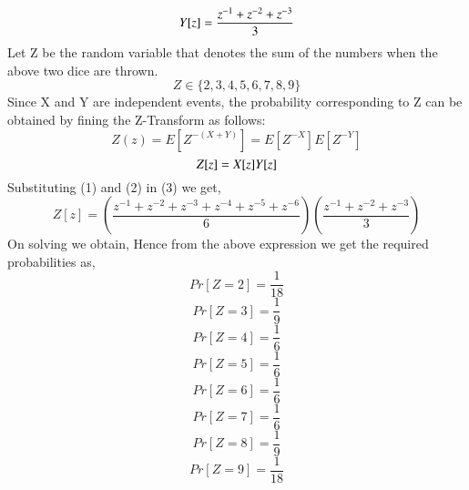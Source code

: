 \documentclass[journal,12pt,twocolumn]{IEEEtran}
\begin{document}
\begin{equation}
\boldmath{Y[z]=\frac{z^{-1}+z^{-2}+z^{-3}}{3}}
\end{equation}
\newline
Let Z be the random variable that denotes the sum of the numbers when the above two dice are thrown.\[ Z \in \{2,3,4,5,6,7,8,9\} \] Since X and Y are independent events, the probability corresponding to Z can be obtained by fining the Z-Transform as follows:
\[Z(z)=E[Z^{-(X+Y)}]=E[Z^{-X}]E[Z^{-Y}] \]
\begin{equation}
   \boldmath{Z[z] = X[z]Y[z]}
\end{equation}
Substituting (1) and (2) in (3) we get,
\[ Z[z]=\left(\frac{z^{-1}+z^{-2}+z^{-3}+ z^{-4}+ z^{-5} + z^{-6}}{6}\right)\left( \frac{z^{-1}+z^{-2}+z^{-3}}{3}\right) \]
On solving we obtain,
\boldmath{\[ Z[z]=\left(\frac{z^{-2}}{18}+\frac{z^{-3}}{9}  +\frac{z^{-4}+z^{-5}+z^{-6}+z^{-7}}{6} +\frac{z^{-8}}{9}  +\frac{z^{-9}}{18}\right)\]}
Hence from the above expression we get the required probabilities as,
\[ Pr[Z=2] = \frac{1}{18} \]
\[ Pr[Z=3] = \frac{1}{9} \]
\[ Pr[Z=4] = \frac{1}{6} \]
\[ Pr[Z=5] = \frac{1}{6} \]
\[ Pr[Z=6] = \frac{1}{6} \]
\[ Pr[Z=7] = \frac{1}{6} \]
\[ Pr[Z=8] = \frac{1}{9} \]
\[ Pr[Z=9] = \frac{1}{18} \]
\end{document}
